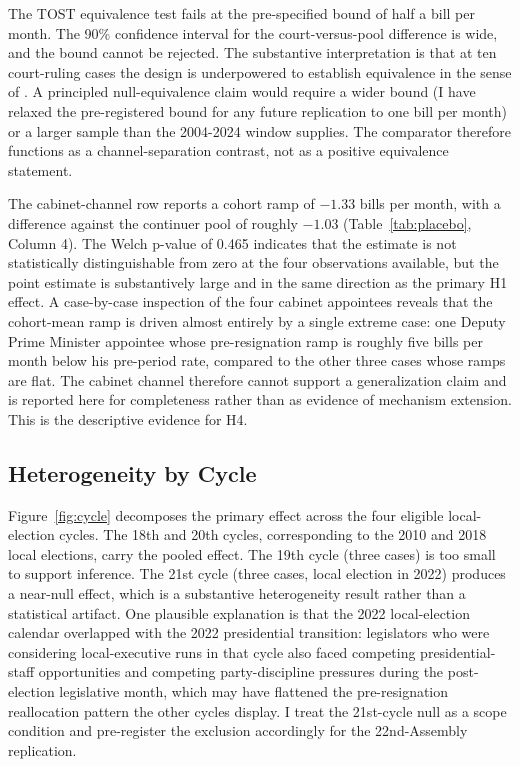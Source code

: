 \documentclass[11pt]{article}
\begin{document}
The TOST equivalence test fails at the pre-specified bound of half a bill per month. The 90\% confidence interval for the court-versus-pool difference is wide, and the bound cannot be rejected. The substantive interpretation is that at ten court-ruling cases the design is underpowered to establish equivalence in the sense of \citet{titiunik2017}. A principled null-equivalence claim would require a wider bound (I have relaxed the pre-registered bound for any future replication to one bill per month) or a larger sample than the 2004-2024 window supplies. The comparator therefore functions as a channel-separation contrast, not as a positive equivalence statement.

The cabinet-channel row reports a cohort ramp of $-1.33$ bills per month, with a difference against the continuer pool of roughly $-1.03$ (Table~\ref{tab:placebo}, Column 4). The Welch p-value of 0.465 indicates that the estimate is not statistically distinguishable from zero at the four observations available, but the point estimate is substantively large and in the same direction as the primary H1 effect. A case-by-case inspection of the four cabinet appointees reveals that the cohort-mean ramp is driven almost entirely by a single extreme case: one Deputy Prime Minister appointee whose pre-resignation ramp is roughly five bills per month below his pre-period rate, compared to the other three cases whose ramps are flat. The cabinet channel therefore cannot support a generalization claim and is reported here for completeness rather than as evidence of mechanism extension. This is the descriptive evidence for H4.

\subsection{Heterogeneity by Cycle}

Figure~\ref{fig:cycle} decomposes the primary effect across the four eligible local-election cycles. The 18th and 20th cycles, corresponding to the 2010 and 2018 local elections, carry the pooled effect. The 19th cycle (three cases) is too small to support inference. The 21st cycle (three cases, local election in 2022) produces a near-null effect, which is a substantive heterogeneity result rather than a statistical artifact. One plausible explanation is that the 2022 local-election calendar overlapped with the 2022 presidential transition: legislators who were considering local-executive runs in that cycle also faced competing presidential-staff opportunities and competing party-discipline pressures during the post-election legislative month, which may have flattened the pre-resignation reallocation pattern the other cycles display. I treat the 21st-cycle null as a scope condition and pre-register the exclusion accordingly for the 22nd-Assembly replication.
\end{document}
